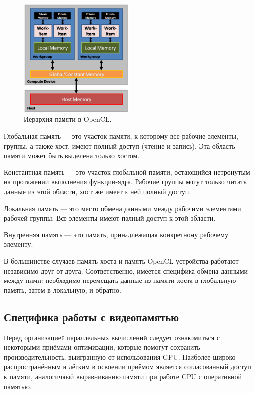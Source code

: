 \begin{figure}[p]
\centering
\includegraphics[width=0.5\textwidth]{include/graphics/image5}
\caption{Иерархия памяти в OpenCL.}
\label{fig:OpenCLMemoryStructure}
\end{figure}

Глобальная память --- это участок памяти, к которому все рабочие элементы, группы, а также хост, имеют полный доступ (чтение и запись). Эта область
памяти может быть выделена только хостом.

Константная память --- это участок глобальной памяти, остающийся нетронутым на протяжении выполнения функции-ядра. Рабочие группы могут только читать данные из этой области, хост же имеет к ней полный доступ.

Локальная память --- это место обмена данными между рабочими элементами рабочей группы. Все элементы имеют полный доступ к этой области.

Внутренняя память --- это память, принадлежащая конкретному рабочему
элементу.

В большинстве случаев память хоста и память OpenCL-устройства работают независимо друг от друга. Соответственно, имеется специфика обмена данными между ними: необходимо перемещать данные из памяти хоста в глобальную память, затем в локальную, и обратно.

\subsection{Специфика работы с видеопамятью}

Перед организацией параллельных вычислений следует ознакомиться с некоторыми приёмами оптимизации, которые помогут сохранить производительность, выигранную от использования GPU. Наиболее широко распространённым и лёгким в освоении приёмом является согласованный доступ к памяти, аналогичный выравниванию памяти при работе CPU с оперативной памятью.

